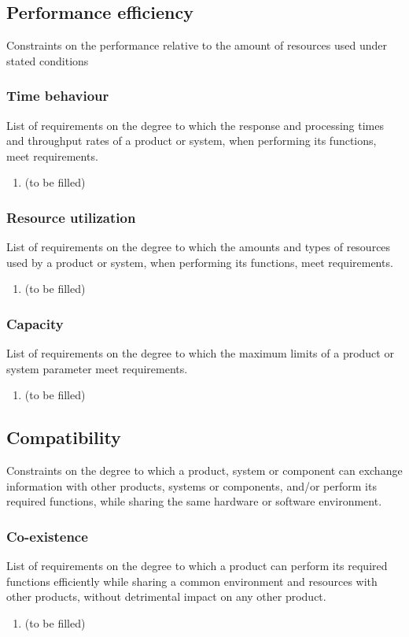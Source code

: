 \subsection{Performance efficiency}
Constraints on the performance relative to the amount of resources used under stated conditions
\subsubsection{Time behaviour}
List of requirements on the degree to which the response and processing times and throughput rates of a product or system, when performing its functions, meet requirements.
\begin{enumerate}
\item (to be filled)
\end{enumerate}
\subsubsection{Resource utilization}
List of requirements on the degree to which the amounts and types of resources used by a product or system, when performing its functions, meet requirements.
\begin{enumerate}
\item (to be filled)
\end{enumerate}
\subsubsection{Capacity}
List of requirements on the degree to which the maximum limits of a product or system parameter meet requirements.
\begin{enumerate}
\item (to be filled)
\end{enumerate}


\subsection{Compatibility}
Constraints on the degree to which a product, system or component can exchange information with other products, systems or
components, and/or perform its required functions, while sharing the same hardware or software environment.
\subsubsection{Co-existence}
List of requirements on the degree to which a product can perform its required functions efficiently while sharing a common environment and resources with other products, without detrimental impact on any other product.
\begin{enumerate}
\item (to be filled)
\end{enumerate}
